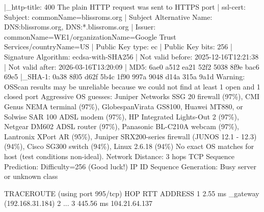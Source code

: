 \documentclass[
]{article}
\newenvironment{Shaded}{}{}
\newcommand{\NormalTok}[1]{#1}
\begin{document}
\begin{Shaded}
\begin{Highlighting}[]
\NormalTok{|\_http{-}title: 400 The plain HTTP request was sent to HTTPS port}
\NormalTok{| ssl{-}cert: Subject: commonName=blissroms.org}
\NormalTok{| Subject Alternative Name: DNS:blissroms.org, DNS:*.blissroms.org}
\NormalTok{| Issuer: commonName=WE1/organizationName=Google Trust Services/countryName=US}
\NormalTok{| Public Key type: ec}
\NormalTok{| Public Key bits: 256}
\NormalTok{| Signature Algorithm: ecdsa{-}with{-}SHA256}
\NormalTok{| Not valid before: 2025{-}12{-}16T12:21:38}
\NormalTok{| Not valid after:  2026{-}03{-}16T13:20:09}
\NormalTok{| MD5:   6ae0 a512 ea21 52f2 5038 8f9e bac6 69e5}
\NormalTok{|\_SHA{-}1: 0a38 8f05 d62f 5b4c 1f90 997a 9048 d14a 315a 9a1d}
\NormalTok{Warning: OSScan results may be unreliable because we could not find at least 1 open and 1 closed port}
\NormalTok{Aggressive OS guesses: Juniper Networks SSG 20 firewall (97\%), CMI Genus NEMA terminal (97\%), GlobespanVirata GS8100, Huawei MT880, or Solwise SAR 100 ADSL modem (97\%), HP Integrated Lights{-}Out 2 (97\%), Netgear DM602 ADSL router (97\%), Panasonic BL{-}C210A webcam (97\%), Lantronix XPort AR (95\%), Juniper SRX200{-}series firewall (JUNOS 12.1 {-} 12.3) (94\%), Cisco SG300 switch (94\%), Linux 2.6.18 (94\%)}
\NormalTok{No exact OS matches for host (test conditions non{-}ideal).}
\NormalTok{Network Distance: 3 hops}
\NormalTok{TCP Sequence Prediction: Difficulty=256 (Good luck!)}
\NormalTok{IP ID Sequence Generation: Busy server or unknown class}

\NormalTok{TRACEROUTE (using port 995/tcp)}
\NormalTok{HOP RTT       ADDRESS}
\NormalTok{1   2.55 ms   \_gateway (192.168.31.184)}
\NormalTok{2   ...}
\NormalTok{3   445.56 ms 104.21.64.137}
\end{Highlighting}
\end{Shaded}
\end{document}

